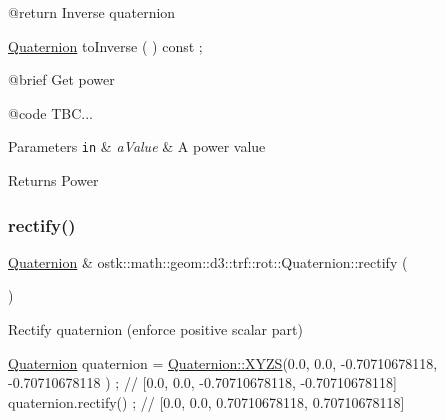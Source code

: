 \begin{DoxyCode}
    @\textcolor{keywordflow}{return}             Inverse quaternion

\hyperlink{classostk_1_1math_1_1geom_1_1d3_1_1trf_1_1rot_1_1_quaternion_ad9fd7d8eb5effb4d4e0394bbb5bb86dc}{Quaternion}              toInverse                                   ( ) \textcolor{keyword}{const} ;

    @brief              Get power
   
    @code
                        TBC...
\end{DoxyCode}



\begin{DoxyParams}[1]{Parameters}
\mbox{\tt in}  & {\em a\+Value} & A power value \\
\hline
\end{DoxyParams}
\begin{DoxyReturn}{Returns}
Power 
\end{DoxyReturn}
\mbox{\label{classostk_1_1math_1_1geom_1_1d3_1_1trf_1_1rot_1_1_quaternion_a6ff0c86d4e24c7a252dcaf0f5e6c624c}} 
\subsubsection{\texorpdfstring{rectify()}{rectify()}}
{\footnotesize\ttfamily \hyperlink{classostk_1_1math_1_1geom_1_1d3_1_1trf_1_1rot_1_1_quaternion}{Quaternion} \& ostk\+::math\+::geom\+::d3\+::trf\+::rot\+::\+Quaternion\+::rectify (\begin{DoxyParamCaption}{ }\end{DoxyParamCaption})}



Rectify quaternion (enforce positive scalar part) 


\begin{DoxyCode}
\hyperlink{classostk_1_1math_1_1geom_1_1d3_1_1trf_1_1rot_1_1_quaternion_ad9fd7d8eb5effb4d4e0394bbb5bb86dc}{Quaternion} quaternion = \hyperlink{classostk_1_1math_1_1geom_1_1d3_1_1trf_1_1rot_1_1_quaternion_ac57ea57a4033622ed1389101b2e58c76}{Quaternion::XYZS}(0.0, 0.0, -0.70710678118, -0.70710678118
      ) ; \textcolor{comment}{// [0.0, 0.0, -0.70710678118, -0.70710678118]}
quaternion.rectify() ; \textcolor{comment}{// [0.0, 0.0, 0.70710678118, 0.70710678118]}
\end{DoxyCode}


